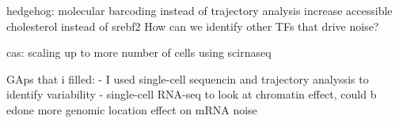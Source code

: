 hedgehog:
molecular barcoding instead of trajectory analysis
increase accessible cholesterol instead of srebf2
How can we identify other TFs that drive noise?



cas:
scaling up to more number of cells using scirnaseq


GAps that i filled:
- I used single-cell sequencin and trajectory analyssis to identify variability
- single-cell RNA-seq to look at chromatin effect, could b edone more
genomic location effect on mRNA noise
